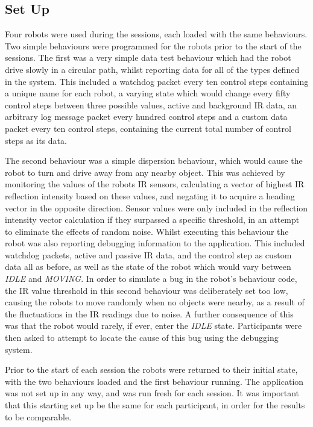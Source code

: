 \subsection{Set Up}
Four robots were used during the sessions, each loaded with the same behaviours. Two simple behaviours were programmed for the robots prior to the start of the sessions. The first was a very simple data test behaviour which had the robot drive slowly in a circular path, whilst reporting data for all of the types defined in the system. This included a watchdog packet every ten control steps containing a unique name for each robot, a varying state which would change every fifty control steps between three possible values, active and background IR data, an arbitrary log message packet every hundred control steps and a custom data packet every ten control steps, containing the current total number of control steps as its data. 

The second behaviour was a simple dispersion behaviour, which would cause the robot to turn and drive away from any nearby object. This was achieved by monitoring the values of the robots IR sensors, calculating a vector of highest IR reflection intensity based on these values, and negating it to acquire a heading vector in the opposite direction. Sensor values were only included in the reflection intensity vector calculation if they surpassed a specific threshold, in an attempt to eliminate the effects of random noise. Whilst executing this behaviour the robot was also reporting debugging information to the application. This included watchdog packets, active and passive IR data, and the control step as custom data all as before, as well as the state of the robot which would vary between \textit{IDLE} and \textit{MOVING}. In order to simulate a bug in the robot's behaviour code, the IR value threshold in this second behaviour was deliberately set too low, causing the robots to move randomly when no objects were nearby, as a result of the fluctuations in the IR readings due to noise. A further consequence of this was that the robot would rarely, if ever, enter the \textit{IDLE} state. Participants were then asked to attempt to locate the cause of this bug using the debugging system.

Prior to the start of each session the robots were returned to their initial state, with the two behaviours loaded and the first behaviour running. The application was not set up in any way, and was run fresh for each session. It was important that this starting set up be the same for each participant, in order for the results to be comparable.

